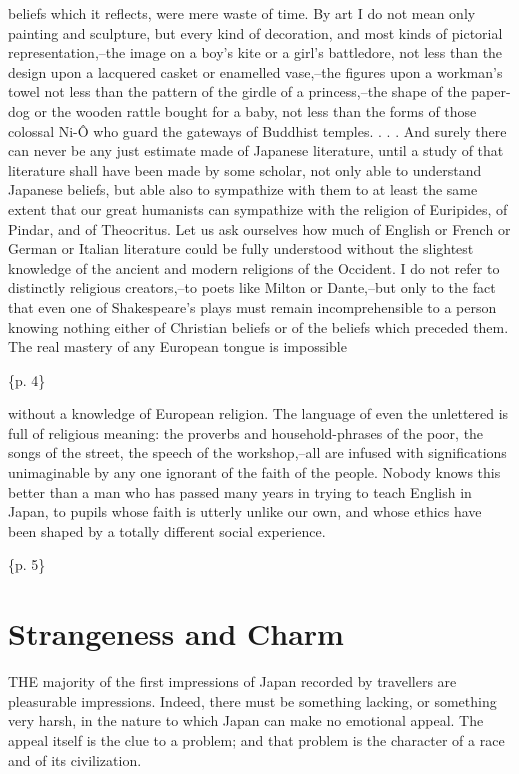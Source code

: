 beliefs which it reflects, were mere waste of time. By art I do not mean only painting and sculpture, but every kind of decoration, and most kinds of pictorial representation,--the image on a boy's kite or a girl's battledore, not less than the design upon a lacquered casket or enamelled vase,--the figures upon a workman's towel not less than the pattern of the girdle of a princess,--the shape of the paper-dog or the wooden rattle bought for a baby, not less than the forms of those colossal Ni-Ô who guard the gateways of Buddhist temples. . . . And surely there can never be any just estimate made of Japanese literature, until a study of that literature shall have been made by some scholar, not only able to understand Japanese beliefs, but able also to sympathize with them to at least the same extent that our great humanists can sympathize with the religion of Euripides, of Pindar, and of Theocritus. Let us ask ourselves how much of English or French or German or Italian literature could be fully understood without the slightest knowledge of the ancient and modern religions of the Occident. I do not refer to distinctly religious creators,--to poets like Milton or Dante,--but only to the fact that even one of Shakespeare's plays must remain incomprehensible to a person knowing nothing either of Christian beliefs or of the beliefs which preceded them. The real mastery of any European tongue is impossible

\{p. 4\}

without a knowledge of European religion. The language of even the unlettered is full of religious meaning: the proverbs and household-phrases of the poor, the songs of the street, the speech of the workshop,--all are infused with significations unimaginable by any one ignorant of the faith of the people. Nobody knows this better than a man who has passed many years in trying to teach English in Japan, to pupils whose faith is utterly unlike our own, and whose ethics have been shaped by a totally different social experience.

\{p. 5\}

\section{Strangeness and Charm}
\label{sec:org56e93fd}

THE majority of the first impressions of Japan recorded by travellers are pleasurable impressions. Indeed, there must be something lacking, or something very harsh, in the nature to which Japan can make no emotional appeal. The appeal itself is the clue to a problem; and that problem is the character of a race and of its civilization.

